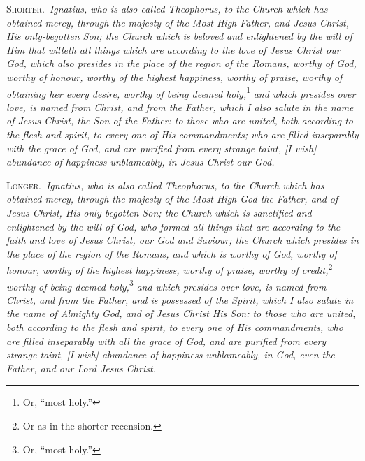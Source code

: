 
\textsc{Shorter.}~\emph{Ignatius, who is also called Theophorus, to the Church which has obtained mercy, through the majesty of the Most High Father, and Jesus Christ, His only-begotten Son; the Church which is beloved and enlightened by the will of Him that willeth all things which are according to the love of Jesus Christ our God, which also presides in the place of the region of the Romans, worthy of God, worthy of honour, worthy of the highest happiness, worthy of praise, worthy of obtaining her every desire, worthy of being deemed holy,}\footnote{Or, “most holy.”}\emph{ and which presides over love, is named from Christ, and from the Father, which I also salute in the name of Jesus Christ, the Son of the Father: to those who are united, both according to the flesh and spirit, to every one of His commandments; who are filled inseparably with the grace of God, and are purified from every strange taint, [I wish] abundance of happiness unblameably, in Jesus Christ our God.}

\textsc{Longer.}~\emph{Ignatius, who is also called Theophorus, to the Church which has obtained mercy, through the majesty of the Most High God the Father, and of Jesus Christ, His only-begotten Son; the Church which is sanctified and enlightened by the will of God, who formed all things that are according to the faith and love of Jesus Christ, our God and Saviour; the Church which presides in the place of the region of the Romans, and which is worthy of God, worthy of honour, worthy of the highest happiness, worthy of praise, worthy of credit,}\footnote{Or as in the shorter recension.}\emph{ worthy of being deemed holy,}\footnote{Or, “most holy.”}\emph{ and which presides over love, is named from Christ, and from the Father, and is possessed of the Spirit, which I also salute in the name of Almighty God, and of Jesus Christ His Son: to those who are united, both according to the flesh and spirit, to every one of His commandments, who are filled inseparably with all the grace of God, and are purified from every strange taint, [I wish] abundance of happiness unblameably, in God, even the Father, and our Lord Jesus Christ.}


